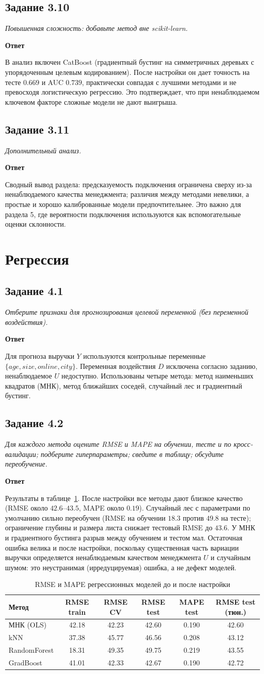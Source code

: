 \documentclass[12pt,a4paper]{article}
\newcommand{\zadanie}[2]{\subsection*{Задание #1}\begingroup\itshape #2\par\endgroup\medskip}
\newcommand{\otvet}{\par\noindent\textbf{Ответ}\par\medskip}
\begin{document}
\zadanie{3.10}{Повышенная сложность: добавьте метод вне scikit-learn.}
\otvet
В анализ включен CatBoost (градиентный бустинг на симметричных деревьях с упорядоченным целевым кодированием). После настройки он дает точность на тесте $0.669$ и AUC $0.739$, практически совпадая с лучшими методами и не превосходя логистическую регрессию. Это подтверждает, что при ненаблюдаемом ключевом факторе сложные модели не дают выигрыша.

\zadanie{3.11}{Дополнительный анализ.}
\otvet
Сводный вывод раздела: предсказуемость подключения ограничена сверху из-за ненаблюдаемого качества менеджмента; различия между методами невелики, а простые и хорошо калиброванные модели предпочтительнее. Это важно для раздела 5, где вероятности подключения используются как вспомогательные оценки склонности.

\section{Регрессия}

\zadanie{4.1}{Отберите признаки для прогнозирования целевой переменной (без переменной воздействия).}
\otvet
Для прогноза выручки $Y$ используются контрольные переменные $\{\textit{age},\textit{size},\textit{online},\textit{city}\}$. Переменная воздействия $D$ исключена согласно заданию, ненаблюдаемое $U$ недоступно. Использованы четыре метода: метод наименьших квадратов (МНК), метод ближайших соседей, случайный лес и градиентный бустинг.

\zadanie{4.2}{Для каждого метода оцените RMSE и MAPE на обучении, тесте и по кросс-валидации; подберите гиперпараметры; сведите в таблицу; обсудите переобучение.}
\otvet
Результаты в таблице~\ref{tab:reg_tuning}. После настройки все методы дают близкое качество (RMSE около $42.6$--$43.5$, MAPE около $0.19$). Случайный лес с параметрами по умолчанию сильно переобучен (RMSE на обучении $18.3$ против $49.8$ на тесте); ограничение глубины и размера листа снижает тестовый RMSE до $43.6$. У МНК и градиентного бустинга разрыв между обучением и тестом мал. Остаточная ошибка велика и после настройки, поскольку существенная часть вариации выручки определяется ненаблюдаемым качеством менеджмента $U$ и случайным шумом: это неустранимая (ирредуцируемая) ошибка, а не дефект моделей.

\begin{table}[H]\centering\small
\caption{RMSE и MAPE регрессионных моделей до и после настройки}\label{tab:reg_tuning}
\begin{tabular}{lccccc}\toprule
Метод & RMSE train & RMSE CV & RMSE test & MAPE test & RMSE test (тюн.)\\\midrule
МНК (OLS) & 42.18 & 42.23 & 42.60 & 0.190 & 42.60\\
kNN & 37.38 & 45.77 & 46.56 & 0.208 & 43.12\\
RandomForest & 18.31 & 49.35 & 49.75 & 0.219 & 43.55\\
GradBoost & 41.01 & 42.33 & 42.67 & 0.190 & 42.72\\\bottomrule
\end{tabular}
\end{table}
\end{document}
